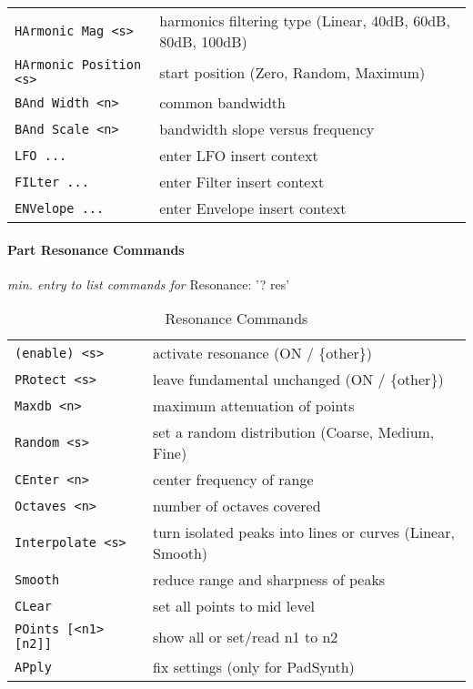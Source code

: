 \begin{table}[H]
\begin{tabular}{l l}
\texttt{HArmonic Mag <s>} &
   harmonics filtering type (Linear, 40dB, 60dB, 80dB, 100dB)\\
\texttt{HArmonic Position <s>} &
   start position (Zero, Random, Maximum)\\
\texttt{BAnd Width <n>} &
   common bandwidth \\
\texttt{BAnd Scale <n>} &
   bandwidth slope versus frequency \\
\texttt{LFO ...} &
   enter LFO insert context \\
\texttt{FILter ...} &
   enter Filter insert context \\
\texttt{ENVelope ...} &
   enter Envelope insert context \\
      \end{tabular}
   \end{table}

\pagebreak
\paragraph{Part Resonance Commands}
\label{paragraph:command_line_part_resonance_commands}
   \textsl{min. entry to list commands for} Resonance: '? res'
   \begin{table}[H]
      \centering
      \caption{Resonance Commands}
      \label{table:part_resonance_commands}
      \begin{tabular}{l l}
   \texttt{(enable) <s>} &
      activate resonance (ON / \{other\}) \\
    \texttt{PRotect <s>} &
      leave fundamental unchanged (ON / \{other\}) \\
   \texttt{Maxdb <n>} &
      maximum attenuation of points \\
   \texttt{Random <s>} &
      set a random distribution (Coarse, Medium, Fine) \\
   \texttt{CEnter <n>} &
      center frequency of range \\
   \texttt{Octaves <n>} &
      number of octaves covered \\
   \texttt{Interpolate <s>} &
      turn isolated peaks into lines or curves (Linear, Smooth) \\
   \texttt{Smooth} &
      reduce range and sharpness of peaks \\
   \texttt{CLear} &
      set all points to mid level \\
   \texttt{POints [<n1> [n2]]} &
      show all or set/read n1 to n2 \\
   \texttt{APply} &
      fix settings (only for PadSynth) \\
      \end{tabular}
   \end{table}

